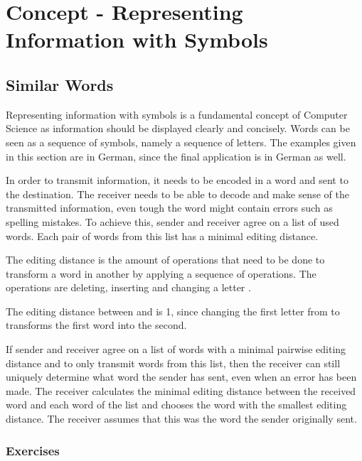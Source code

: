\chapter{Concept - Representing Information with Symbols}
\label{chapter:representingInformationWithWymbols}

\section{Similar Words}
\label{section:similarWords}

Representing information with symbols is a fundamental concept of Computer Science as information should be displayed clearly and concisely. Words can be seen as a sequence of symbols, namely a sequence of letters. The examples given in this section are in German, since the final application is in German as well.

In order to transmit information, it needs to be encoded in a word and sent to the destination.  The receiver needs to be able to decode and make sense of the transmitted information, even tough the word might contain errors such as spelling mistakes. To achieve this, sender and receiver agree on a list of used words. Each pair of words from this list has a minimal editing distance. 

The editing distance is the amount of operations that need to be done to transform a word in another by applying a sequence of operations. The operations are deleting, inserting and changing a letter \cite{AnD}.

\begin{example}
    The editing distance between  and  is 1, since changing the first letter from  to  transforms the first word into the second.
\end{example}

If sender and receiver agree on a list of words with a minimal pairwise editing distance and to only transmit words from this list, then the receiver can still uniquely determine what word the sender has sent, even when an error has been made. The receiver calculates the minimal editing distance between the received word and each word of the list and chooses the word with the smallest editing distance. The receiver assumes that this was the word the sender originally sent.

\subsection{Exercises}

